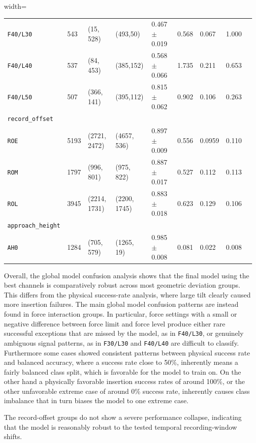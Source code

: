 \begin{table}[htbp]
\begin{adjustbox}{width=\textwidth}
\begin{tabular}{lllllllll}
        \texttt{F40/L30} & 543 & (15, 528) & (493,50) & 0.467 $\pm$ 0.019 & 0.568 & 0.067 & 1.000 \\
        \texttt{F40/L40} & 537 & (84, 453) & (385,152) & 0.568 $\pm$ 0.066 & 1.735 & 0.211 & 0.653 \\
        \texttt{F40/L50} & 507 & (366, 141) & (395,112) & 0.815 $\pm$ 0.062 & 0.902 & 0.106 & 0.263 \\
        \midrule
        \texttt{record\_offset} \\
        \texttt{ROE} & 5193 & (2721, 2472) & (4657, 536) & 0.897 $\pm$ 0.009 & 0.556 & 0.0959 & 0.110 \\
        \texttt{ROM} & 1797 & (996, 801) & (975, 822) & 0.887 $\pm$ 0.017 & 0.527 & 0.112 & 0.113 \\
        \texttt{ROL} & 3945 & (2214, 1731) & (2200, 1745) & 0.883 $\pm$ 0.018 & 0.623 & 0.129 & 0.106 \\
        \midrule
        \texttt{approach\_height} \\
        \texttt{AH0} & 1284 & (705, 579) & (1265, 19) & 0.985 $\pm$ 0.008 & 0.081 & 0.022 & 0.008 \\
        \bottomrule
    \end{tabular}
    \end{adjustbox}
\end{table}


Overall, the global model confusion analysis shows that the final model using the best channels is comparatively robust across most geometric deviation groups. This differs from the physical success-rate analysis, where large tilt clearly caused more insertion failures. The main global model confusion patterns are instead found in force interaction groups. In particular, force settings with a small or negative difference between force limit and force level produce either rare successful exceptions that are missed by the model, as in \texttt{F40/L30}, or genuinely ambiguous signal patterns, as in \texttt{F30/L30} and \texttt{F40/L40} are difficult to classify. Furthermore some cases showed consistent patterns between physical success rate and balanced accuracy, where a success rate close to 50\%, inherently means a fairly balanced class split, which is favorable for the model to train on. On the other hand a physically favorable insertion success rates of around 100\%, or the other unfavorable extreme case of around 0\% success rate, inherently causes class imbalance that in turn biases the model to one extreme case.

The record-offset groups do not show a severe performance collapse, indicating that the model is reasonably robust to the tested temporal recording-window shifts.

